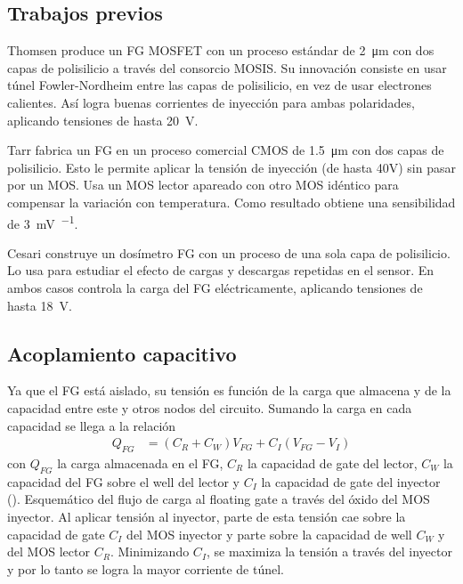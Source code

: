 \subsection{Trabajos previos}
Thomsen\cite{thomsen_floating-gate_1991} produce un FG MOSFET
con un proceso estándar de \SI{2}{\micro\meter} con dos capas de polisilicio
a través del consorcio MOSIS\cite{noauthor_mosis_nodate}.
Su innovación consiste en usar túnel Fowler-Nordheim entre las capas de
polisilicio, en vez de usar electrones calientes. 
Así logra buenas corrientes de inyección para ambas polaridades,
aplicando tensiones de hasta \SI{20}{\volt}.

Tarr\cite{tarr_sensitive_2004} fabrica un FG en un proceso comercial CMOS
de \SI{1.5}{\micro\meter} con dos capas de polisilicio. 
Esto le permite aplicar la tensión de inyección 
(de hasta 40V) sin pasar por un MOS.
Usa un MOS lector apareado con otro MOS idéntico para compensar 
la variación con temperatura.
Como resultado obtiene una sensibilidad de \SI{3}{\milli\volt\per\rad}.

Cesari\cite{cesari_floating_2014} construye un dosímetro FG 
con un proceso de una sola capa de polisilicio.
Lo usa para estudiar el efecto de cargas y descargas repetidas
en el sensor.
En ambos casos controla la carga del FG eléctricamente,
aplicando tensiones de hasta \SI{18}{\volt}.

%
\subsection{Acoplamiento capacitivo}
Ya que el FG está aislado,
su tensión es función de la carga que almacena 
y de la capacidad entre este y otros nodos del circuito.
Sumando la carga en cada capacidad se llega a la relación
\begin{align}
    Q_{FG} &= (C_R + C_W) V_{FG} + C_I (V_{FG}-V_I)
    \label{eq:ccoupling}
\end{align}
con $Q_{FG}$ la carga almacenada en el FG, $C_R$ la capacidad de gate del
lector, $C_W$ la capacidad del FG sobre el well del lector y $C_I$ la capacidad
de gate del inyector ().
{Esquemático del flujo de carga al floating gate 
a través del óxido del MOS inyector.
Al aplicar tensión al inyector,
parte de esta tensión cae sobre 
la capacidad de gate $C_I$ del MOS inyector 
y parte sobre la capacidad de well $C_W$ y del MOS lector $C_R$.
Minimizando $C_I$, se maximiza la tensión a través del inyector
y por lo tanto se logra la mayor corriente de túnel.}
